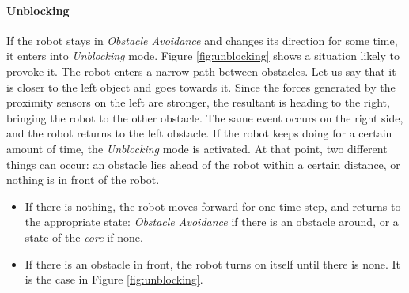 \documentclass[oneside, a4paper, 12pt]{memoir}
\begin{document}
			\paragraph{Unblocking}
			\label{sec:unblocking}
			If the robot stays in \emph{Obstacle Avoidance} and changes its direction for some time, it enters into \emph{Unblocking} mode. Figure \ref{fig:unblocking} shows a situation likely to provoke it. The robot enters a narrow path between obstacles. Let us say that it is closer to the left object and goes towards it. Since the forces generated by the proximity sensors on the left are stronger, the resultant is heading to the right, bringing the robot to the other obstacle. The same event occurs on the right side, and the robot returns to the left obstacle. If the robot keeps doing for a certain amount of time, the \emph{Unblocking} mode is activated. At that point, two different things can occur: an obstacle lies ahead of the robot within a certain distance, or nothing is in front of the robot.
			\begin{itemize}
				\item If there is nothing, the robot moves forward for one time step, and returns to the appropriate state: \emph{Obstacle Avoidance} if there is an obstacle around, or a state of the \emph{core} if none.
				\item If there is an obstacle in front, the robot turns on itself until there is none. It is the case in Figure \ref{fig:unblocking}.
			\end{itemize}
\end{document}

